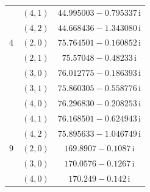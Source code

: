 \begin{table}[H]
\begin{minipage}[t]{0.325\textwidth}
\begin{tabular}[t]{|c|c|c|}
 & $(4,1)$ & $44.995003-0.795337\,\mathrm{i}$ \\
 & $(4,2)$ & $44.668436-1.343080\,\mathrm{i}$ \\
\hline
$4$ & $(2,0)$ & $75.764501-0.160852\,\mathrm{i}$ \\
 & $(2,1)$ & $75.57048-0.48233\,\mathrm{i}$ \\
 & $(3,0)$ & $76.012775-0.186393\,\mathrm{i}$ \\
 & $(3,1)$ & $75.860305-0.558776\,\mathrm{i}$ \\
 & $(4,0)$ & $76.296830-0.208253\,\mathrm{i}$ \\
 & $(4,1)$ & $76.168501-0.624943\,\mathrm{i}$ \\
 & $(4,2)$ & $75.895633-1.046749\,\mathrm{i}$ \\
\hline
$9$ & $(2,0)$ & $169.8907-0.1087\,\mathrm{i}$ \\
 & $(3,0)$ & $170.0576-0.1267\,\mathrm{i}$ \\
 & $(4,0)$ & $170.249-0.142\,\mathrm{i}$ \\
\hline
\end{tabular}
\end{minipage}
\endgroup
\end{table}

